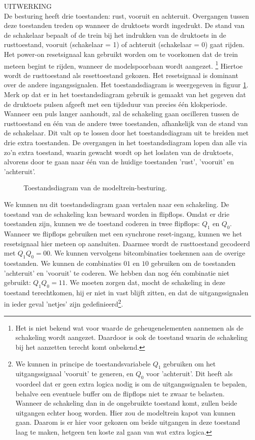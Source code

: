 UITWERKING\\
De besturing heeft drie toestanden: rust, vooruit en
achteruit.
Overgangen tussen deze toestanden treden op
wanneer de druktoets wordt ingedrukt.
De stand van de schakelaar bepaalt of de trein bij
het indrukken van de druktoets in de rusttoestand, vooruit (schakelaar = 1)
of achteruit (schakelaar = 0) gaat rijden.
Het power-on resetsignaal kan gebruikt worden om te voorkomen
dat de trein meteen begint te rijden, wanneer de modelspoorbaan
wordt aangezet.
\footnote{Het is niet bekend wat voor waarde de geheugenelementen aannemen als
de schakeling wordt aangezet. Daardoor is ook de toestand waarin de schakeling
bij het aanzetten terecht komt onbekend.}
Hiertoe wordt de rusttoestand als resettoestand gekozen.
Het resetsignaal is dominant over de andere ingangssignalen.
Het toestandsdiagram is weergegeven in figuur \ref{figuur:modeltrein}.
Merk op dat er in het toestandsdiagram gebruik is gemaakt van
het gegeven dat de druktoets pulsen afgeeft met een tijdsduur
van precies \'e\'en klokperiode.
Wanneer een puls langer aanhoudt, zal de schakeling gaan oscilleren
tussen de rusttoestand en \'e\'en van de andere twee toestanden,
afhankelijk van de stand van de schakelaar.
Dit valt op te lossen door het toestandsdiagram uit te breiden
met drie extra toestanden.
De overgangen in het toestandsdiagram lopen dan alle via zo'n
extra toestand, waarin gewacht wordt op het loslaten van de
druktoets, alvorens door te gaan naar \'e\'en van de huidige
toestanden 'rust', 'vooruit' en 'achteruit'.

\begin{figure}[bth]
\centerline{}
\caption{Toestandsdiagram van de modeltrein-besturing.}
\label{figuur:modeltrein}
\end{figure}


We kunnen nu dit toestandsdiagram gaan vertalen naar een schakeling.
De toestand van de schakeling kan bewaard worden in flipflops.
Omdat er drie toestanden zijn, kunnen we de toestand coderen
in twee flipflops: $Q_{1}$ en $Q_{0}$.
Wanneer we flipflops gebruiken met een synchrone reset-ingang,
kunnen we het resetsignaal hier meteen op aansluiten.
Daarmee wordt de rusttoestand gecodeerd met $Q_{1} Q_{0} = 00$.
We kunnen vervolgens bitcombinaties toekennen aan de overige toestanden.
We kunnen de combinaties $01$ en $10$ gebruiken om de toestanden
'achteruit' en 'vooruit' te coderen.
We hebben dan nog \'e\'en combinatie niet gebruikt: $Q_{1} Q_{0} = 11$.
We moeten zorgen dat, mocht de schakeling in deze toestand terechtkomen,
hij er niet in vast blijft zitten, en dat de uitgangssignalen 
in ieder geval 'netjes' zijn 
gedefinieerd\footnote{We kunnen in principe de toestandsvariabele $Q_{1}$ 
gebruiken om het uitgangssignaal
'vooruit' te generen, en $Q_{0}$ voor 'achteruit'.
Dit heeft als voordeel dat er geen extra logica nodig is om
de uitgangssignalen te bepalen, behalve een eventuele buffer
om de flipflops niet te zwaar te belasten.
Wanneer de schakeling dan in de ongebruikte toestand komt, zullen
beide uitgangen echter hoog worden. Hier zou de modeltrein kapot van kunnen
gaan. Daarom is er hier voor gekozen om beide uitgangen in deze
toestand laag te maken, hetgeen ten koste zal gaan van wat extra logica.}.

